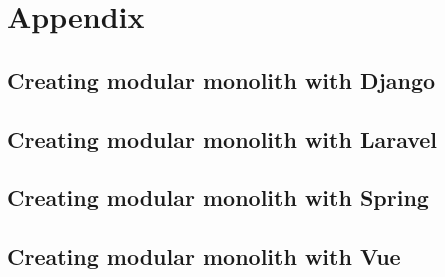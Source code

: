 \chapter{Appendix}

\section{Creating modular monolith with Django}
\label{sec:DjangoImpl}


\section{Creating modular monolith with Laravel}
\label{sec:LaravelImpl}


\section{Creating modular monolith with Spring}
\label{sec:SpringImpl}


\section{Creating modular monolith with Vue}
\label{sec:VueImpl}

